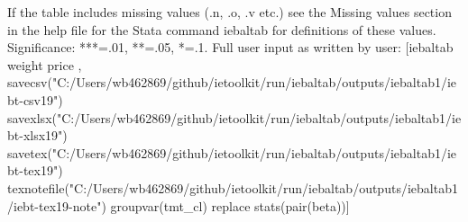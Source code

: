 If the table includes missing values (.n, .o, .v etc.) see the Missing values section in the help file for the Stata command iebaltab for definitions of these values. Significance: ***=.01, **=.05, *=.1. Full user input as written by user: [iebaltab weight price , savecsv("C:/Users/wb462869/github/ietoolkit/run/iebaltab/outputs/iebaltab1/iebt-csv19") savexlsx("C:/Users/wb462869/github/ietoolkit/run/iebaltab/outputs/iebaltab1/iebt-xlsx19") savetex("C:/Users/wb462869/github/ietoolkit/run/iebaltab/outputs/iebaltab1/iebt-tex19") texnotefile("C:/Users/wb462869/github/ietoolkit/run/iebaltab/outputs/iebaltab1/iebt-tex19-note") groupvar(tmt\_cl) replace stats(pair(beta))] 
